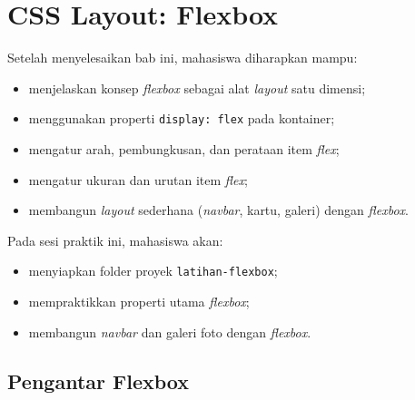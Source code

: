 
\chapter{CSS Layout: Flexbox}
\label{chap:flexbox}

\begin{capaian}
Setelah menyelesaikan bab ini, mahasiswa diharapkan mampu:
\begin{itemize}
  \item menjelaskan konsep \emph{flexbox} sebagai alat \emph{layout} satu dimensi;
  \item menggunakan properti \texttt{display: flex} pada kontainer;
  \item mengatur arah, pembungkusan, dan perataan item \emph{flex};
  \item mengatur ukuran dan urutan item \emph{flex};
  \item membangun \emph{layout} sederhana (\emph{navbar}, kartu, galeri) dengan \emph{flexbox}.
\end{itemize}
\end{capaian}

\begin{tujuanpraktik}
Pada sesi praktik ini, mahasiswa akan:
\begin{itemize}
  \item menyiapkan folder proyek \texttt{latihan-flexbox};
  \item mempraktikkan properti utama \emph{flexbox};
  \item membangun \emph{navbar} dan galeri foto dengan \emph{flexbox}.
\end{itemize}
\end{tujuanpraktik}

\section{Pengantar Flexbox}
\label{sec:pengantar-flexbox}

